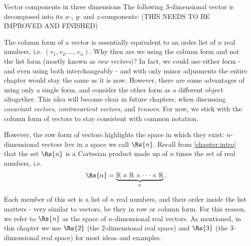 \begin{example}{Vector components in three dimensions}{}
	The following $3$-dimensional vector is decomposed into its $x$-, $y$- and $z$-components:
	(THIS NEEDS TO BE IMPROVED AND FINISHED)

	\centering
\end{example}

The column form of a vector is essentially equivalent to an order list of $n$ real numbers, i.e. $(v_{1},v_{2},\dots,v_{n})$. Why then are we using the column form and not the list form (mostly known as \emph{row vectors})? In fact, we could use either form - and even using both interchangeably - and with only minor adjusments the entire chapter would stay the same as it is now. However, there are some advantages of using only a single form, and consider the other form as a different object altogether. This idea will become clear in future chapters, when discussing \emph{covariant vectors}, \emph{contravarient vectors}, and \emph{tensors}. For now, we stick with the column form of vectors to stay consistent with common notation.

However, the row form of vectors highlights the space in which they exist: $n$-dimensional vectors live in a space we call $\Rs{n}$. Recall from \autoref{chapter:intro} that the set $\Rs{n}$ is a Cartesian product made up of $n$ times the set of real numbers, i.e.
\begin{equation}
	\Rs{n} = \underbrace{\mathbb{R} \times \mathbb{R} \times \cdots \times \mathbb{R}}_{n}.
	\label{eq:Rn}
\end{equation}

Each member of this set is a list of $n$ real numbers, and their order inside the list matters - very similar to vectors, be they in row or column form. For this reason, we refer to $\Rs{n}$ as the space of $n$-dimensional real vectors. As mentioned, in this chapter we use $\Rs{2}$ (the 2-dimensional real space) and $\Rs{3}$ (the 3-dimensional real space) for most ideas and examples.

